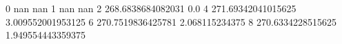 0 nan nan
1 nan nan
2 268.6838684082031 0.0
4 271.69342041015625 3.009552001953125
6 270.7519836425781 2.068115234375
8 270.6334228515625 1.949554443359375
